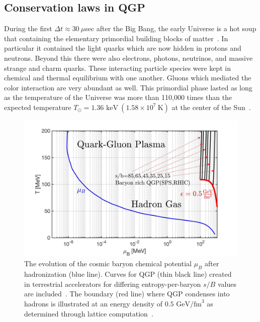 \documentclass[universe,article,submit,moreauthors,pdftex,a4paper]{Definitions/mdpi}
\newcommand{\GeV}{\text{ GeV}}
\newcommand{\keV}{\text{ keV}}
\begin{document}
\subsection{Conservation laws in QGP}\label{sec:Conservation}
\noindent During the first $\Delta t\approx30\ \mu$sec after the Big Bang, the early Universe is a hot soup that containing the elementary primordial building blocks of matter~\cite{Rafelski:2015cxa}. In particular it contained the light quarks which are now hidden in protons and neutrons. Beyond this there were also electrons, photons, neutrinos, and massive strange and charm quarks. These interacting particle species were kept in chemical and thermal equilibrium with one another. Gluons which mediated the color interaction are very abundant as well. This primordial phase lasted as long as the temperature of the Universe was more than 110,000 times than the expected temperature $T_{\odot}=1.36\keV\ (1.58\times10^{7}\ \mathrm{K})$ at the center of the Sun~\cite{Castellani:1996cm}.

\begin{figure}[ht]
 \centering
 \includegraphics[width=\textwidth]{./plots/QGPDiagram_A.jpg}
 \caption{ The evolution of the cosmic baryon chemical potential $\mu_{B}$ after hadronization (blue line). Curves for QGP (thin black line) created in terrestrial accelerators for differing entropy-per-baryon $s/B$ values are included~\cite{Rafelski:1987nv}. The boundary (red line) where QGP condenses into hadrons is illustrated at an energy density of $0.5\GeV/\mathrm{fm}^{3}$ as determined through lattice computation~\cite{HotQCD:2014kol}.}
 \label{phaseQGP} 
\end{figure}
\end{document}
